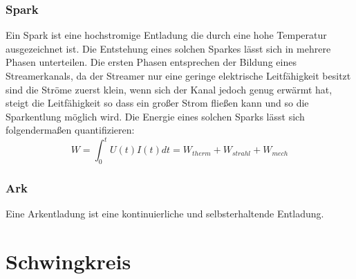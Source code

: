 \subsubsection{Spark}
Ein Spark ist eine hochstromige Entladung die durch eine hohe Temperatur ausgezeichnet ist. Die Entstehung eines solchen Sparkes lässt sich in mehrere Phasen unterteilen. Die ersten Phasen entsprechen der Bildung eines Streamerkanals, da der Streamer nur eine geringe elektrische Leitfähigkeit besitzt sind die Ströme zuerst klein, wenn sich der Kanal jedoch genug erwärmt hat, steigt die Leitfähigkeit so dass ein großer Strom fließen kann und so die Sparkentlung möglich wird.
Die Energie eines solchen Sparks lässt sich folgendermaßen quantifizieren:
\begin{equation}
    W = \int_{0}^{t} U(t)I(t)dt = W_{therm} + W_{strahl} + W_{mech}
\end{equation}
\subsubsection{Ark}
Eine Arkentladung ist eine kontinuierliche und selbsterhaltende Entladung.







\section{Schwingkreis}
\label{sec:oscillations}


